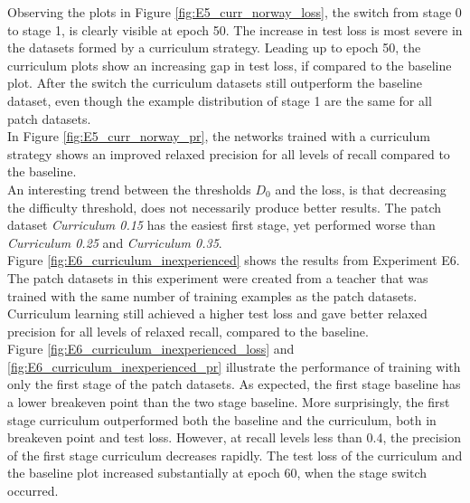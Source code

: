 Observing the plots in Figure \ref{fig:E5_curr_norway_loss}, the switch from stage 0 to stage 1, is clearly visible at epoch 50. The increase in test loss is most severe in the datasets formed by a curriculum strategy. Leading up to epoch 50, the curriculum plots show an increasing gap in test loss, if compared to the baseline plot. After the switch the curriculum datasets still outperform the baseline dataset, even though the example distribution of stage 1 are the same for all patch datasets.\\

In Figure \ref{fig:E5_curr_norway_pr}, the networks trained with a curriculum strategy shows an improved relaxed precision for all levels of recall compared to the baseline.\\

An interesting trend between the thresholds $D_0$ and the loss, is that decreasing the difficulty threshold, does not necessarily produce better results. The patch dataset \textit{Curriculum 0.15} has the easiest first stage, yet performed worse than \textit{Curriculum 0.25} and \textit{Curriculum 0.35}.\\

Figure \ref{fig:E6_curriculum_inexperienced} shows the results from Experiment E6. The patch datasets in this experiment were created from a teacher that was trained with the same number of training examples as the patch datasets. Curriculum learning still achieved a higher test loss and gave better relaxed precision for all levels of relaxed recall, compared to the baseline.\\

Figure \ref{fig:E6_curriculum_inexperienced_loss} and \ref{fig:E6_curriculum_inexperienced_pr} illustrate the performance of training with only the first stage of the patch datasets. As expected, the first stage baseline has a lower breakeven point than the two stage baseline. More surprisingly, the first stage curriculum outperformed both the baseline and the curriculum, both in breakeven point and test loss. However, at recall levels less than 0.4, the precision of the first stage curriculum decreases rapidly. The test loss of the curriculum and the baseline plot  increased substantially at epoch 60, when the stage switch occurred. \\


